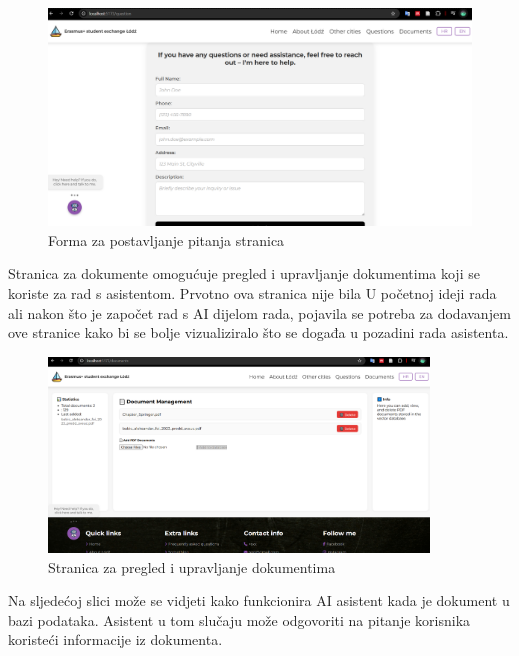 \documentclass[]{foi}
\begin{document}
\begin{figure}[ht]
  \centering
  \includegraphics[width=1\textwidth]{./assets/question.png}
  \caption{Forma za postavljanje pitanja stranica}
  \label{fig:slika97}
\end{figure}

Stranica za dokumente omogućuje pregled i upravljanje dokumentima koji se koriste za rad s asistentom. Prvotno ova stranica nije bila U
početnoj ideji rada ali nakon što je započet rad s AI dijelom rada, pojavila se potreba za dodavanjem ove stranice kako bi se bolje 
vizualiziralo što se događa u pozadini rada asistenta.

\begin{figure}[ht]
  \centering
  \includegraphics[width=0.9\textwidth]{./assets/documents.png}
  \caption{Stranica za pregled i upravljanje dokumentima}
  \label{fig:slika98}
\end{figure}
\newpage

Na sljedećoj slici može se vidjeti kako funkcionira AI asistent kada je dokument u bazi podataka. Asistent u tom slučaju može odgovoriti na
pitanje korisnika koristeći informacije iz dokumenta.
\end{document}
